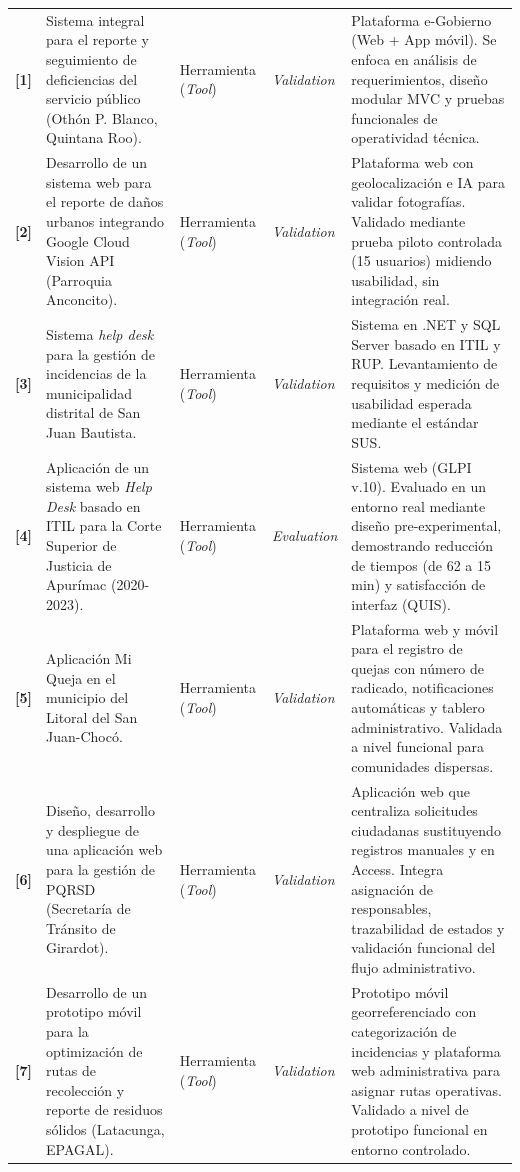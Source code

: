 \begin{longtable}{@{} c >{\raggedright\arraybackslash}p{4cm} l l >{\raggedright\arraybackslash}p{5.5cm} @{}}
	\textbf{[1]} & Sistema integral para el reporte y seguimiento de deficiencias del servicio público (Othón P. Blanco, Quintana Roo). & Herramienta (\textit{Tool}) & \textit{Validation} & Plataforma e-Gobierno (Web + App móvil). Se enfoca en análisis de requerimientos, diseño modular MVC y pruebas funcionales de operatividad técnica. \\
	\addlinespace
	\textbf{[2]} & Desarrollo de un sistema web para el reporte de daños urbanos integrando Google Cloud Vision API (Parroquia Anconcito). & Herramienta (\textit{Tool}) & \textit{Validation} & Plataforma web con geolocalización e IA para validar fotografías. Validado mediante prueba piloto controlada (15 usuarios) midiendo usabilidad, sin integración real. \\
	\addlinespace
	\textbf{[3]} & Sistema \textit{help desk} para la gestión de incidencias de la municipalidad distrital de San Juan Bautista. & Herramienta (\textit{Tool}) & \textit{Validation} & Sistema en .NET y SQL Server basado en ITIL y RUP. Levantamiento de requisitos y medición de usabilidad esperada mediante el estándar SUS. \\
	\addlinespace
	\textbf{[4]} & Aplicación de un sistema web \textit{Help Desk} basado en ITIL para la Corte Superior de Justicia de Apurímac (2020-2023). & Herramienta (\textit{Tool}) & \textit{Evaluation} & Sistema web (GLPI v.10). Evaluado en un entorno real mediante diseño pre-experimental, demostrando reducción de tiempos (de 62 a 15 min) y satisfacción de interfaz (QUIS). \\
	\addlinespace
	\textbf{[5]} & Aplicación Mi Queja en el municipio del Litoral del San Juan-Chocó. & Herramienta (\textit{Tool}) & \textit{Validation} & Plataforma web y móvil para el registro de quejas con número de radicado, notificaciones automáticas y tablero administrativo. Validada a nivel funcional para comunidades dispersas. \\
	\addlinespace
	\textbf{[6]} & Diseño, desarrollo y despliegue de una aplicación web para la gestión de PQRSD (Secretaría de Tránsito de Girardot). & Herramienta (\textit{Tool}) & \textit{Validation} & Aplicación web que centraliza solicitudes ciudadanas sustituyendo registros manuales y en Access. Integra asignación de responsables, trazabilidad de estados y validación funcional del flujo administrativo. \\
	\addlinespace
	\textbf{[7]} & Desarrollo de un prototipo móvil para la optimización de rutas de recolección y reporte de residuos sólidos (Latacunga, EPAGAL). & Herramienta (\textit{Tool}) & \textit{Validation} & Prototipo móvil georreferenciado con categorización de incidencias y plataforma web administrativa para asignar rutas operativas. Validado a nivel de prototipo funcional en entorno controlado. \\

\end{longtable}
